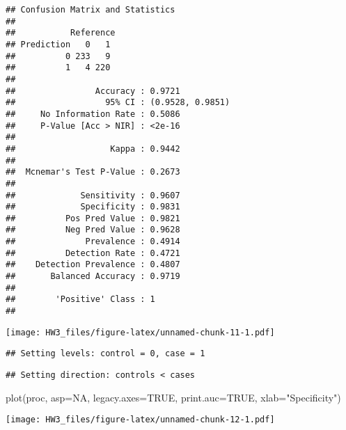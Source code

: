 \documentclass[
]{article}
\newenvironment{Shaded}{\begin{snugshade}}{\end{snugshade}}
\newcommand{\AttributeTok}[1]{\textcolor[rgb]{0.77,0.63,0.00}{#1}}
\newcommand{\ConstantTok}[1]{\textcolor[rgb]{0.00,0.00,0.00}{#1}}
\newcommand{\FunctionTok}[1]{\textcolor[rgb]{0.00,0.00,0.00}{#1}}
\newcommand{\NormalTok}[1]{#1}
\newcommand{\OtherTok}[1]{\textcolor[rgb]{0.56,0.35,0.01}{#1}}
\newcommand{\SpecialCharTok}[1]{\textcolor[rgb]{0.00,0.00,0.00}{#1}}
\newcommand{\StringTok}[1]{\textcolor[rgb]{0.31,0.60,0.02}{#1}}
\begin{document}
\begin{verbatim}
## Confusion Matrix and Statistics
## 
##           Reference
## Prediction   0   1
##          0 233   9
##          1   4 220
##                                           
##                Accuracy : 0.9721          
##                  95% CI : (0.9528, 0.9851)
##     No Information Rate : 0.5086          
##     P-Value [Acc > NIR] : <2e-16          
##                                           
##                   Kappa : 0.9442          
##                                           
##  Mcnemar's Test P-Value : 0.2673          
##                                           
##             Sensitivity : 0.9607          
##             Specificity : 0.9831          
##          Pos Pred Value : 0.9821          
##          Neg Pred Value : 0.9628          
##              Prevalence : 0.4914          
##          Detection Rate : 0.4721          
##    Detection Prevalence : 0.4807          
##       Balanced Accuracy : 0.9719          
##                                           
##        'Positive' Class : 1               
## 
\end{verbatim}

\begin{Shaded}
\end{Shaded}

\texttt{[image: HW3\_files/figure-latex/unnamed-chunk-11-1.pdf]}

\begin{Shaded}
\end{Shaded}

\begin{verbatim}
## Setting levels: control = 0, case = 1
\end{verbatim}

\begin{verbatim}
## Setting direction: controls < cases
\end{verbatim}

\begin{Shaded}
\begin{Highlighting}[]
\FunctionTok{plot}\NormalTok{(proc, }\AttributeTok{asp=}\ConstantTok{NA}\NormalTok{, }\AttributeTok{legacy.axes=}\ConstantTok{TRUE}\NormalTok{, }\AttributeTok{print.auc=}\ConstantTok{TRUE}\NormalTok{, }\AttributeTok{xlab=}\StringTok{"Specificity"}\NormalTok{)}
\end{Highlighting}
\end{Shaded}

\texttt{[image: HW3\_files/figure-latex/unnamed-chunk-12-1.pdf]}
\end{document}
